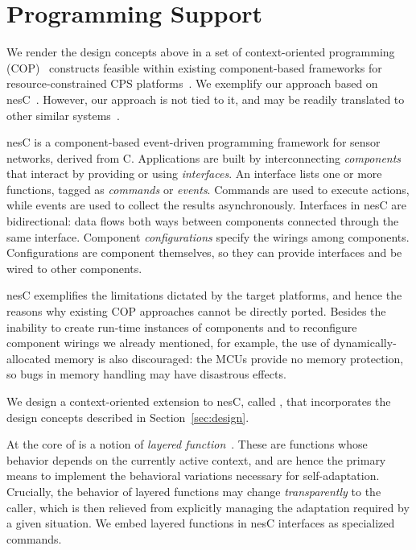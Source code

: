 
\section{Programming Support}
\label{sec:conesc}

We render the design concepts above in a set of context-oriented
programming (COP)~\cite{Hirschfeld08} constructs feasible within
existing component-based frameworks for resource-constrained CPS
platforms~\cite{mottola10:survey}.  We exemplify our approach based on
nesC~\cite{gay03nesc}. However, our approach is not tied to it, and
may be readily translated to other similar
systems~\cite{mottola10:survey}.

 nesC is a component-based event-driven
programming framework for sensor networks, derived from
C. Applications are built by interconnecting \emph{components} that
interact by providing or using \emph{interfaces}. An interface lists
one or more functions, tagged as \emph{commands} or
\emph{events}. Commands are used to execute actions, while events are
used to collect the results asynchronously.  Interfaces in nesC are
bidirectional: data flows both ways between components connected
through the same interface.  Component \emph{configurations} specify
the wirings among components. Configurations are component themselves,
so they can provide interfaces and be wired to other components.

nesC exemplifies the limitations dictated by the target platforms, and
hence the reasons why existing COP approaches cannot be directly
ported. Besides the inability to create run-time instances of
components and to reconfigure component wirings we already mentioned,
for example, the use of dynamically-allocated memory is also
discouraged: the MCUs provide no memory protection, so bugs in memory
handling may have disastrous effects.

\fakepar{\conesc} We design a
context-oriented extension to nesC, called \conesc, that incorporates
the design concepts described in Section~\ref{sec:design}. 

At the core of \conesc is a notion of \emph{layered
  function}~\cite{Hirschfeld08}. These are functions whose behavior
depends on the currently active context, and are hence the primary
means to implement the behavioral variations necessary for
self-adaptation. Crucially, the behavior of layered functions may
change \emph{transparently} to the caller, which is then relieved from
explicitly managing the adaptation required by a given situation. We
embed layered functions in nesC interfaces as specialized commands.


